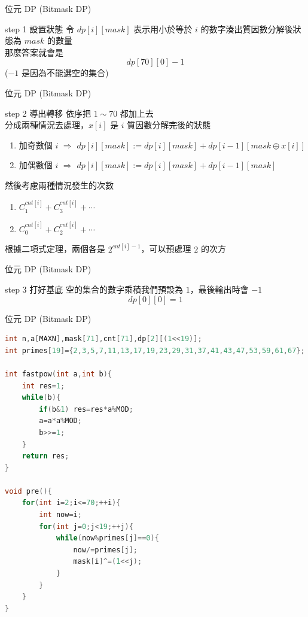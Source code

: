 \documentclass[aspectratio=169]{beamer}
\begin{document}
    \begin{frame}{位元 DP (Bitmask DP)}
        \begin{alertblock}{step 1 設置狀態}
            令 $dp[i][mask]$ 表示用小於等於 $i$ 的數字湊出質因數分解後狀態為 $mask$ 的數量 \\
            \vspace{2.5mm}
            那麼答案就會是 $$dp[70][0]-1$$ ($-1$ 是因為不能選空的集合)
        \end{alertblock}
    \end{frame}

    \begin{frame}{位元 DP (Bitmask DP)}
        \begin{block}{step 2 導出轉移}
            依序把 $1\sim 70$ 都加上去\\
            分成兩種情況去處理，$x[i]$ 是 $i$ 質因數分解完後的狀態
            \begin{enumerate}
                \item 加奇數個 $i$ $\Rightarrow$ $dp[i][mask] := dp[i][mask] + dp[i-1][mask \oplus x[i]]$
                \item 加偶數個 $i$ $\Rightarrow$ $dp[i][mask] := dp[i][mask] + dp[i-1][mask]$
            \end{enumerate}
            然後考慮兩種情況發生的次數
            \begin{enumerate}
                \item $C^{cnt[i]}_1 + C^{cnt[i]}_3 + \cdots$
                \item $C^{cnt[i]}_0 + C^{cnt[i]}_2 + \cdots$
            \end{enumerate}
            根據二項式定理，兩個各是 $2^{cnt[i]-1}$，可以預處理 $2$ 的次方
        \end{block}
    \end{frame}
    
    \begin{frame}{位元 DP (Bitmask DP)}
        \begin{block}{step 3 打好基底}
            空的集合的數字乘積我們預設為 $1$，最後輸出時會 $-1$
            $$dp[0][0]=1$$
        \end{block}
    \end{frame}

    \begin{frame}[fragile]{位元 DP (Bitmask DP)}
        \begin{lstlisting}[language=C++, basicstyle=\ttfamily\tiny]
int n,a[MAXN],mask[71],cnt[71],dp[2][(1<<19)];
int primes[19]={2,3,5,7,11,13,17,19,23,29,31,37,41,43,47,53,59,61,67};

int fastpow(int a,int b){
    int res=1;
    while(b){
        if(b&1) res=res*a%MOD;
        a=a*a%MOD;
        b>>=1;
    }
    return res;
} 

void pre(){
    for(int i=2;i<=70;++i){
        int now=i;
        for(int j=0;j<19;++j){
            while(now%primes[j]==0){
                now/=primes[j];
                mask[i]^=(1<<j);
            }
        }
    }
}
        \end{lstlisting}
    \end{frame}
\end{document}
